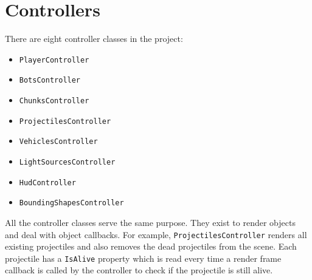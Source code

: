 \section{Controllers}

There are eight controller classes in the project:

\begin{itemize}
  \item  \texttt{PlayerController}
  \item \texttt{BotsController}
  \item \texttt{ChunksController}
  \item \texttt{ProjectilesController}
  \item \texttt{VehiclesController}
  \item \texttt{LightSourcesController}
  \item \texttt{HudController}
  \item \texttt{BoundingShapesController}
\end{itemize}

All the controller classes serve the same purpose.
They exist to render objects and deal with object callbacks.
For example, \texttt{ProjectilesController} renders all existing projectiles and also removes the dead projectiles from the scene.
Each projectile has a \texttt{IsAlive} property which is read every time a render frame callback is called by the controller to check if the projectile is still alive.
